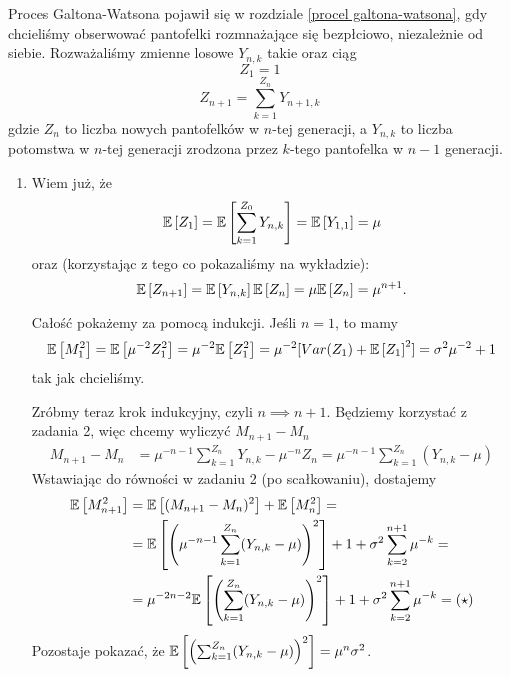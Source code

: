 \begin{solution}
  Proces Galtona-Watsona pojawił się w rozdziale \ref{procel galtona-watsona}, gdy chcieliśmy obserwować pantofelki rozmnażające się bezpłciowo, niezależnie od siebie. Rozważaliśmy zmienne losowe $Y_{n,k}$ takie oraz ciąg
  $$Z_1=1$$
  $$Z_{n+1}=\sum_{k=1}^{Z_n}Y_{n+1,k}$$
  gdzie $Z_n$ to liczba nowych pantofelków w $n$-tej generacji, a $Y_{n,k}$ to liczba potomstwa w $n$-tej generacji zrodzona przez $k$-tego pantofelka w $n-1$ generacji.

  \begin{enumerate}[label=(\alph*)]
    \item Wiem już, że
      $$\expected{Z_1}=\expected{\sum_{k=1}^{Z_0}Y_{n,k}}=\expected{Y_{1,1}}=\mu$$
      oraz (korzystając z tego co pokazaliśmy na wykładzie):
      $$\expected{Z_{n+1}}=\expected{Y_{n,k}}\expected{Z_n}=\mu\expected{Z_n}=\mu^{n+1}.$$

      Całość pokażemy za pomocą indukcji. Jeśli $n=1$, to mamy
      $$\expected{M_1^2}=\expected{\mu^{-2}Z_1^2}=\mu^{-2}\expected{Z_1^2}=\mu^{-2}[Var(Z_1)+\expected{Z_1}^2]=\sigma^2\mu^{-2}+1$$
      tak jak chcieliśmy.

      Zróbmy teraz krok indukcyjny, czyli $n\implies n+1$. Będziemy korzystać z zadania 2, więc chcemy wyliczyć $M_{n+1}-M_n$
      \begin{align*}
        M_{n+1}-M_n&=\mu^{-n-1}\sum_{k=1}^{Z_{n}}Y_{n,k}-\mu^{-n}Z_n=\mu^{-n-1}\sum_{k=1}^{Z_n}(Y_{n,k}-\mu)
      \end{align*}
      Wstawiając do równości w zadaniu 2 (po scałkowaniu), dostajemy
      \begin{align*}
        \expected{M_{n+1}^2}&=\expected{(M_{n+1}-M_n)^2}+\expected{M_{n}^2}=\\ 
                            &=\expected{\left( \mu^{-n-1}\sum_{k=1}^{Z_n}(Y_{n,k}-\mu) \right)^2} +1+\sigma^2\sum_{k=2}^{n+1}\mu^{-k}=\\ 
                            &=\mu^{-2n-2}\expected{\left(\sum_{k=1}^{Z_n}(Y_{n,k}-\mu)\right)^2}+1+\sigma^2\sum_{k=2}^{n+1}\mu^{-k}=(\star)
      \end{align*}
      Pozostaje pokazać, że $\expected{\left(\sum_{k=1}^{Z_n}(Y_{n,k}-\mu)\right)^2}=\mu^{n}\sigma^2$.


\end{enumerate}
\end{solution}
